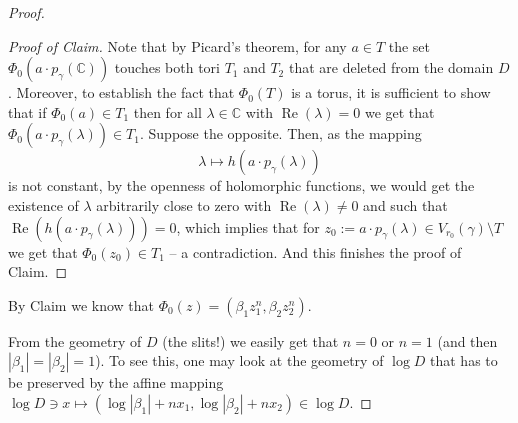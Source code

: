 \documentclass[10pt,a4paper]{amsart}
\begin{document}
\begin{proof}
\begin{proof}[Proof of Claim]
Note that by Picard's theorem, for any $a\in T$ the set $\Phi_0(a\cdot p_{\gamma}(\mathbb C))$ touches both tori $T_1$ and $T_2$ that are deleted from the domain $D$. Moreover, to establish the fact that $\Phi_0(T)$ is a torus, it is sufficient to show that if $\Phi_0(a)\in T_1$ then for all $\lambda\in\mathbb C$ with $\operatorname{Re}(\lambda)=0$ we get that $\Phi_0(a\cdot p_{\gamma}(\lambda))\in T_1$. Suppose the opposite. Then, as the mapping
\begin{equation}
    \lambda\mapsto h(a\cdot p_{\gamma}(\lambda))
\end{equation}
is not constant, by the openness of holomorphic functions, we would get the existence of $\lambda$ arbitrarily close to zero with $\operatorname{Re}(\lambda)\neq 0$ and such that $\operatorname{Re}(h(a\cdot p_{\gamma}(\lambda)))=0$, which implies that for $z_0:=a\cdot p_{\gamma}(\lambda)\in V_{r_0}(\gamma)\setminus T$ we get that $\Phi_0(z_0)\in T_1$  -- a contradiction. And this finishes the proof of Claim. 
\end{proof}


By Claim we know that $\Phi_0(z)=(\beta_1z_1^n,\beta_2z_2^n)$. 

 From the geometry of $D$ (the slits!) we easily get that $n=0$ or $n=1$ (and then $|\beta_1|=|\beta_2|=1$). To see this, one may look at the geometry of $\log D$
 that has to be preserved by the affine mapping $\log D\owns x \mapsto (\log|\beta_1|+n x_1,\log|\beta_2|+nx_2)\in\log D$.
\end{proof}
\end{document}
